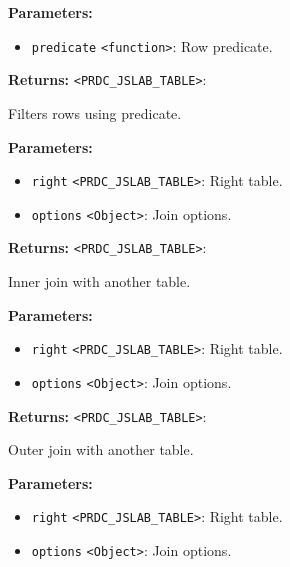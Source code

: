 \documentclass[12pt,a4paper]{article}
\begin{document}
\noindent \textbf{Parameters:}
\begin{itemize}
  \item \texttt{predicate} \texttt{<function>}: Row predicate.
\end{itemize}

\noindent \textbf{Returns:} \texttt{<PRDC\_JSLAB\_TABLE>}:

\noindent Filters rows using predicate.

\vspace{5mm}
\noindent {}


\noindent \textbf{Parameters:}
\begin{itemize}
  \item \texttt{right} \texttt{<PRDC\_JSLAB\_TABLE>}: Right table.
  \item \texttt{options} \texttt{<Object>}: Join options.
\end{itemize}

\noindent \textbf{Returns:} \texttt{<PRDC\_JSLAB\_TABLE>}:

\noindent Inner join with another table.

\vspace{5mm}
\noindent {}


\noindent \textbf{Parameters:}
\begin{itemize}
  \item \texttt{right} \texttt{<PRDC\_JSLAB\_TABLE>}: Right table.
  \item \texttt{options} \texttt{<Object>}: Join options.
\end{itemize}

\noindent \textbf{Returns:} \texttt{<PRDC\_JSLAB\_TABLE>}:

\noindent Outer join with another table.

\vspace{5mm}
\noindent {}


\noindent \textbf{Parameters:}
\begin{itemize}
  \item \texttt{right} \texttt{<PRDC\_JSLAB\_TABLE>}: Right table.
  \item \texttt{options} \texttt{<Object>}: Join options.
\end{itemize}
\end{document}
